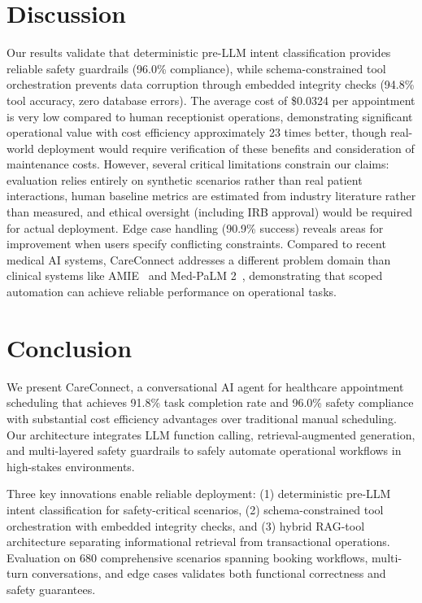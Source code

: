 \documentclass[conference]{IEEEtran}
\begin{document}
\section{Discussion}
Our results validate that deterministic pre-LLM intent classification provides reliable safety guardrails (96.0\% compliance), while schema-constrained tool orchestration prevents data corruption through embedded integrity checks (94.8\% tool accuracy, zero database errors). The average cost of \$0.0324 per appointment is very low compared to human receptionist operations, demonstrating significant operational value with cost efficiency approximately 23 times better, though real-world deployment would require verification of these benefits and consideration of maintenance costs. However, several critical limitations constrain our claims: evaluation relies entirely on synthetic scenarios rather than real patient interactions, human baseline metrics are estimated from industry literature rather than measured, and ethical oversight (including IRB approval) would be required for actual deployment. Edge case handling (90.9\% success) reveals areas for improvement when users specify conflicting constraints. Compared to recent medical AI systems, CareConnect addresses a different problem domain than clinical systems like AMIE~\cite{tu2025towards} and Med-PaLM 2~\cite{singhal2025toward}, demonstrating that scoped automation can achieve reliable performance on operational tasks.

\section{Conclusion}

We present CareConnect, a conversational AI agent for healthcare appointment scheduling that achieves 91.8\% task completion rate and 96.0\% safety compliance with substantial cost efficiency advantages over traditional manual scheduling. Our architecture integrates LLM function calling, retrieval-augmented generation, and multi-layered safety guardrails to safely automate operational workflows in high-stakes environments.

Three key innovations enable reliable deployment: (1) deterministic pre-LLM intent classification for safety-critical scenarios, (2) schema-constrained tool orchestration with embedded integrity checks, and (3) hybrid RAG-tool architecture separating informational retrieval from transactional operations. Evaluation on 680 comprehensive scenarios spanning booking workflows, multi-turn conversations, and edge cases validates both functional correctness and safety guarantees.
\end{document}
